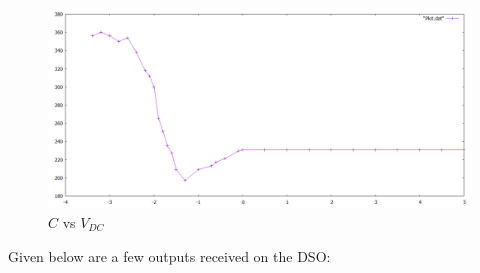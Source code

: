\documentclass[12pt]{article}
\begin{document}
\begin{figure}[H]
	\centering
	\includegraphics[width = \linewidth, trim = {0 0 0 0}, clip]{Plot.PNG}
	\caption{\(C\) vs \(V_{DC}\)}
\end{figure}

Given below are a few outputs received on the DSO:
\end{document}
